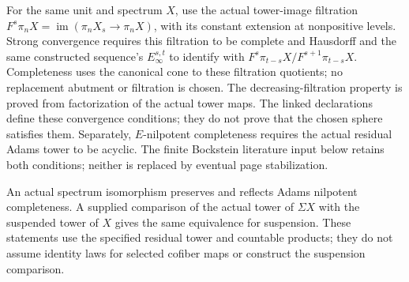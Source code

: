 \begin{definition}
  \label{def:actual-adams-strong-convergence}
  \leanok
  For the same unit and spectrum $X$, use the actual tower-image filtration
  $F^s\pi_nX=\operatorname{im}(\pi_nX_s\to\pi_nX)$, with its constant
  extension at nonpositive levels. Strong convergence requires this
  filtration to be complete and Hausdorff and the same constructed
  sequence's $E_\infty^{s,t}$ to identify with
  $F^s\pi_{t-s}X/F^{s+1}\pi_{t-s}X$.
  Completeness uses the canonical cone to these filtration quotients;
  no replacement abutment or filtration is chosen. The decreasing-filtration
  property is proved from factorization of the actual tower maps.
  The linked declarations define these convergence conditions; they do
  not prove that the chosen sphere satisfies them.
  Separately, $E$-nilpotent completeness requires the actual residual Adams
  tower to be acyclic. The finite Bockstein literature input below retains
  both conditions; neither is replaced by eventual page stabilization.
\end{definition}

\begin{proposition}
  \label{prop:adams-completeness-transport}
  \leanok
  An actual spectrum isomorphism preserves and reflects Adams nilpotent
  completeness. A supplied comparison of the actual tower of $\Sigma X$
  with the suspended tower of $X$ gives the same equivalence for
  suspension. These statements use the specified residual tower and
  countable products; they do not assume identity laws for selected
  cofiber maps or construct the suspension comparison.
\end{proposition}

